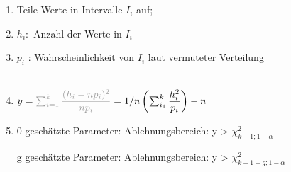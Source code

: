 \begin{enumerate}
\item Teile Werte in Intervalle $I_i$ auf; 
\item $h_i:$ Anzahl der Werte in $I_i$  
\item $p_i$ : Wahrscheinlichkeit von $I_i$ laut vermuteter Verteilung \\
\\

\item $y = \gray{ \sum_{i=1}^k \dfrac{(h_i -np_i)^2}{n p_i} }= 1/n \left( \sum_{i_1}^k \dfrac{h_i^2}{p_i} \right) -n $
\\

\item 0 geschätzte Parameter: Ablehnungsbereich: y > $\chi^2_{k-1;1-\alpha}$

g geschätzte Parameter: Ablehnungsbereich: y > $\chi^2_{k-1-g;1-\alpha}$

\end{enumerate}